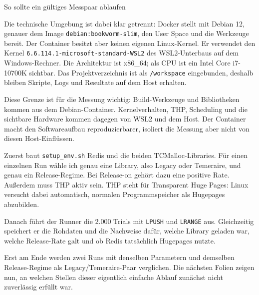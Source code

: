 \documentclass[aspectratio=169,10pt]{beamer}
\newcommand{\smallcode}[1]{\texttt{\footnotesize #1}}
\begin{document}
\begin{frame}{So sollte ein g\"ultiges Messpaar ablaufen}
{  \par\medskip
  Die technische Umgebung ist dabei klar getrennt: Docker stellt mit Debian 12, genauer dem Image \smallcode{debian:bookworm-slim}, den User Space und die Werkzeuge bereit. Der Container besitzt aber keinen eigenen Linux-Kernel. Er verwendet den Kernel \smallcode{6.6.114.1-microsoft-standard-WSL2} des WSL2-Unterbaus auf dem Windows-Rechner. Die Architektur ist x86\_64; als CPU ist ein Intel Core i7-10700K sichtbar. Das Projektverzeichnis ist als \smallcode{/workspace} eingebunden, deshalb bleiben Skripte, Logs und Resultate auf dem Host erhalten.

  \par\medskip
  Diese Grenze ist f\"ur die Messung wichtig: Build-Werkzeuge und Bibliotheken kommen aus dem Debian-Container. Kernelverhalten, THP, Scheduling und die sichtbare Hardware kommen dagegen von WSL2 und dem Host. Der Container macht den Softwareaufbau reproduzierbarer, isoliert die Messung aber nicht von diesen Host-Einfl\"ussen.
  
  \par\medskip
  Zuerst baut \smallcode{setup\_env.sh} Redis und die beiden TCMalloc-Libraries. Für einen einzelnen Run wähle ich genau eine Library, also Legacy oder Temeraire, und genau ein Release-Regime. Bei Release-on gehört dazu eine positive Rate. Außerdem muss THP aktiv sein. THP steht für Transparent Huge Pages: Linux versucht dabei automatisch, normalen Programmspeicher als Hugepages abzubilden.
  
  \par\medskip
  Danach führt der Runner die 2.000 Trials mit \smallcode{LPUSH} und \smallcode{LRANGE} aus. Gleichzeitig speichert er die Rohdaten und die Nachweise dafür, welche Library geladen war, welche Release-Rate galt und ob Redis tatsächlich Hugepages nutzte.
  
  \par\medskip
  Erst am Ende werden zwei Runs mit denselben Parametern und demselben Release-Regime als Legacy/Temeraire-Paar verglichen. Die nächsten Folien zeigen nun, an welchen Stellen dieser eigentlich einfache Ablauf zunächst nicht zuverlässig erfüllt war.
}
\end{frame}
\end{document}
